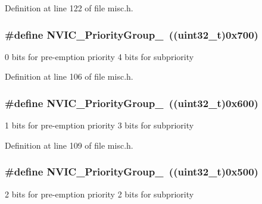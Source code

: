 Definition at line 122 of file misc.\-h.

\hypertarget{group___m_i_s_c___preemption___priority___group_gaeac0cf537f65d17bc19aee2410b2b60e}{
\subsubsection[{N\-V\-I\-C\-\_\-\-Priority\-Group\-\_\-0}]{\setlength{\rightskip}{0pt plus 5cm}\#define N\-V\-I\-C\-\_\-\-Priority\-Group\-\_~((uint32\-\_\-t)0x700)}}\label{group___m_i_s_c___preemption___priority___group_gaeac0cf537f65d17bc19aee2410b2b60e}
0 bits for pre-\/emption priority 4 bits for subpriority 

Definition at line 106 of file misc.\-h.

\hypertarget{group___m_i_s_c___preemption___priority___group_ga89bf0bf9e70f1a372a541b1b8d7493aa}{
\subsubsection[{N\-V\-I\-C\-\_\-\-Priority\-Group\-\_\-1}]{\setlength{\rightskip}{0pt plus 5cm}\#define N\-V\-I\-C\-\_\-\-Priority\-Group\-\_~((uint32\-\_\-t)0x600)}}\label{group___m_i_s_c___preemption___priority___group_ga89bf0bf9e70f1a372a541b1b8d7493aa}
1 bits for pre-\/emption priority 3 bits for subpriority 

Definition at line 109 of file misc.\-h.

\hypertarget{group___m_i_s_c___preemption___priority___group_ga505002e8b76aef65499ca371e40ec8b4}{
\subsubsection[{N\-V\-I\-C\-\_\-\-Priority\-Group\-\_\-2}]{\setlength{\rightskip}{0pt plus 5cm}\#define N\-V\-I\-C\-\_\-\-Priority\-Group\-\_~((uint32\-\_\-t)0x500)}}\label{group___m_i_s_c___preemption___priority___group_ga505002e8b76aef65499ca371e40ec8b4}
2 bits for pre-\/emption priority 2 bits for subpriority 


